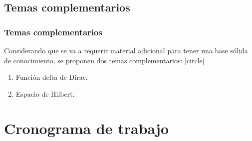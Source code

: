 \documentclass[12pt]{beamer}
\begin{document}



\subsection{Temas complementarios}

\begin{frame}
\frametitle{Temas complementarios}
Considerando que se va a requerir material adicional para tener una base sólida de conocimiento, se proponen dos temas complementarios:
[circle]
\begin{enumerate}[<+->]
\item Función delta de Dirac.
\item Espacio de Hilbert.
\end{enumerate}
\end{frame}

\section{Cronograma de trabajo}
\end{document}
